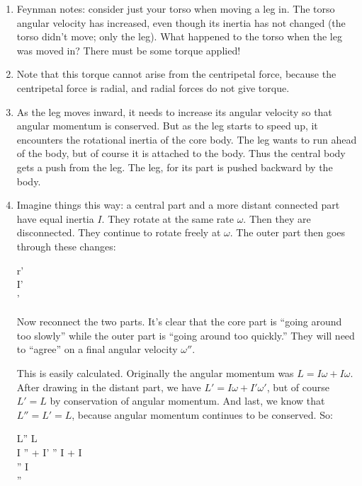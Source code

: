 \begin{enumerate}
  \item Feynman notes: consider just your torso when moving a leg in.
  The torso angular velocity has increased, even though its inertia has
  not changed (the torso didn't move; only the leg). What happened to
  the torso when the leg was moved in? There must be some torque
  applied!

  \item Note that this torque cannot arise from the centripetal force,
  because the centripetal force is radial, and radial forces do not give
  torque.

  \item As the leg moves inward, it needs to increase its angular
  velocity so that angular momentum is conserved. But as the leg starts
  to speed up, it encounters the rotational inertia of the core body.
  The leg wants to run ahead of the body, but of course it is attached
  to the body. Thus the central body gets a push from the leg. The leg,
  for its part is pushed backward by the body.

  \item Imagine things this way: a central part and a more distant
  connected part have equal inertia $I$. They rotate at the same rate
  $\omega$. Then they are disconnected. They continue to rotate freely
  at $\omega$. The outer part then goes through these changes:

  \begin{nedqn}
    r' \eqcol {}
  \\
    I' \eqcol {}
  \\
    \omega'  \omega
  \end{nedqn}

  \noindent
  Now reconnect the two parts. It's clear that the core part is ``going
  around too slowly'' while the outer part is ``going around too
  quickly.'' They will need to ``agree'' on a final angular velocity
  $\omega''$.

  This is easily calculated. Originally the angular momentum was $L = I
  \omega + I \omega$. After drawing in the distant part, we have $L' =
  I\omega + I' \omega'$, but of course $L' = L$ by conservation of
  angular momentum. And last, we know that $L'' = L' = L$, because
  angular momentum continues to be conserved. So:

  \begin{nedqn}
    L''
  \eqcol
    L
  \\
    I \omega'' + I' \omega''
  \eqcol
    I \omega + I \omega
  \\
     \omega''
   I\omega
  \\
    \omega''
  \eqcol
     \omega
  \end{nedqn}


\end{enumerate}
